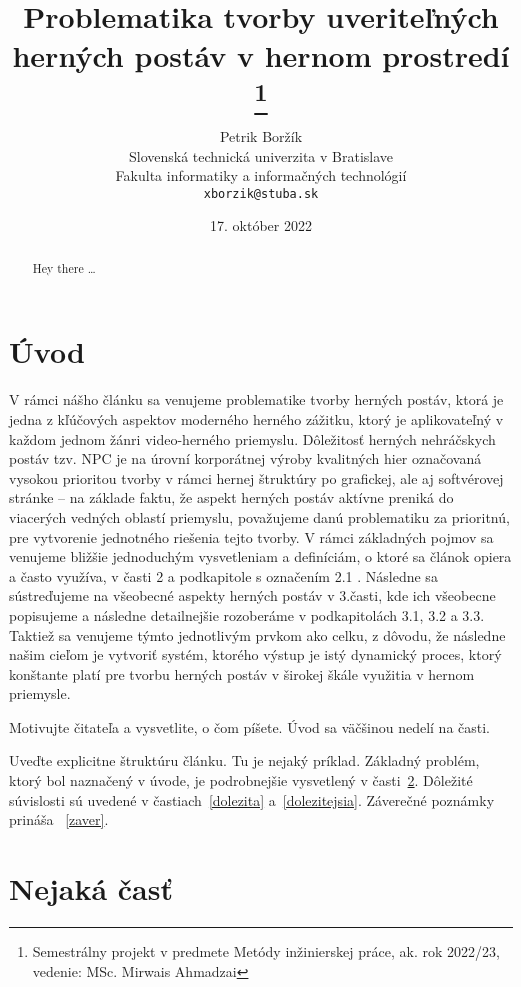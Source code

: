 \documentclass[10pt,twoside,slovak,a4paper]{article}
\title{Problematika tvorby uveriteľných herných postáv v hernom prostredí \thanks{Semestrálny projekt v predmete Metódy inžinierskej práce, ak. rok 2022/23, vedenie: MSc. Mirwais Ahmadzai}} %
\author{Petrik Boržík\\[3pt]
	{\small Slovenská technická univerzita v Bratislave}\\
	{\small Fakulta informatiky a informačných technológií}\\
	{\small \texttt{xborzik@stuba.sk}}
	}
\date{\small 17. október 2022} %
\begin{document}
\maketitle

\begin{abstract}
Hey there
\ldots
\end{abstract}



\section{Úvod}
V rámci nášho článku sa venujeme problematike tvorby herných postáv, ktorá je jedna z kľúčových aspektov moderného herného zážitku, ktorý je aplikovateľný v každom jednom žánri video-herného priemyslu. Dôležitosť herných nehráčskych postáv tzv. NPC je na úrovní korporátnej výroby kvalitných hier označovaná vysokou prioritou tvorby v rámci hernej štruktúry po grafickej, ale aj softvérovej stránke – na základe faktu, že aspekt herných postáv aktívne preniká do viacerých vedných oblastí priemyslu, považujeme danú problematiku za prioritnú, pre vytvorenie jednotného riešenia tejto tvorby. V rámci základných pojmov sa venujeme bližšie jednoduchým vysvetleniam a definíciám, o ktoré sa článok opiera a často využíva, v časti 2 a podkapitole s označením 2.1 . Následne sa sústreďujeme na všeobecné aspekty herných postáv v 3.časti, kde ich všeobecne popisujeme a následne detailnejšie rozoberáme v podkapitolách 3.1, 3.2 a 3.3. Taktiež sa venujeme týmto jednotlivým prvkom ako celku, z dôvodu, že následne našim cieľom je vytvoriť systém, ktorého výstup je istý dynamický proces, ktorý konštante platí pre tvorbu herných postáv v širokej škále využitia v hernom priemysle. 






Motivujte čitateľa a vysvetlite, o čom píšete. Úvod sa väčšinou nedelí na časti.

Uveďte explicitne štruktúru článku. Tu je nejaký príklad.
Základný problém, ktorý bol naznačený v úvode, je podrobnejšie vysvetlený v časti~\ref{nejaka}.
Dôležité súvislosti sú uvedené v častiach~\ref{dolezita} a~\ref{dolezitejsia}.
Záverečné poznámky prináša ~\ref{zaver}.



\section{Nejaká časť} \label{nejaka}
\end{document}
